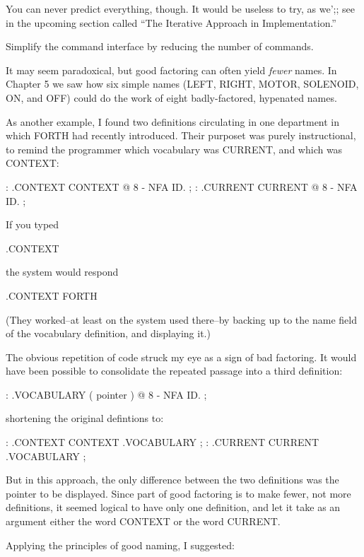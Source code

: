 You can never predict everything, though. It would be useless to try, as we';; see in the upcoming section called ``The Iterative Approach in Implementation.''

\begin{tip}
Simplify the command interface by reducing the number of commands.
\end{tip}
It may seem paradoxical, but good factoring can often yield \emph{fewer} names. In Chapter 5 we saw how six simple names (LEFT, RIGHT, MOTOR, SOLENOID, ON, and OFF) could do the work of eight badly-factored, hypenated names.

As another example, I found two definitions circulating in one department in which FORTH had recently introduced. Their purposet was purely instructional, to remind the programmer which vocabulary was CURRENT, and which was CONTEXT:

\begin{Code}
: .CONTEXT   CONTEXT @  8 -  NFA  ID. ;
: .CURRENT   CURRENT @  8 -  NFA  ID. ;
\end{Code}
If you typed

\begin{Code}
.CONTEXT
\end{Code}
the system would respond


\begin{Code}
.CONTEXT FORTH
\end{Code}
(They worked--at least on the system used there--by backing up to the name field of the vocabulary definition, and displaying it.)

The obvious repetition of code struck my eye as a sign of bad factoring. It would have been possible to consolidate the repeated passage into a third definition:

\begin{Code}
: .VOCABULARY   ( pointer )  @  8 -  NFA  ID. ;
\end{Code}
shortening the original defintions to:

\begin{Code}
: .CONTEXT   CONTEXT .VOCABULARY ;
: .CURRENT   CURRENT .VOCABULARY ;
\end{Code}
But in this approach, the only difference between the two definitions was the pointer to be displayed. Since part of good factoring is to make fewer, not more definitions, it seemed logical to have only one definition, and let it take as an argument either the word CONTEXT or the word CURRENT.

Applying the principles of good naming, I suggested:

